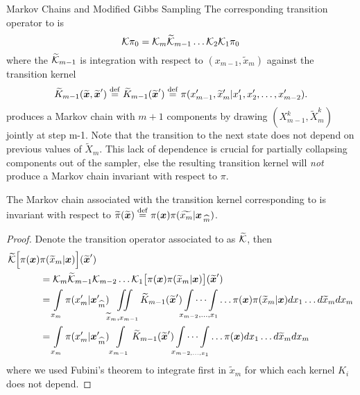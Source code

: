 \begin{chapter}{Markov Chains and Modified Gibbs Sampling}
The corresponding transition operator to  is
\begin{equation}
  \mathcal K\pi_0 = \mathcal K_m \widetilde {\mathcal K}_{m-1}\dots \mathcal K_2 \mathcal K_1 \pi_0
\end{equation}
where the $\widetilde{\mathcal K}_{m-1}$ is integration with respect to $(x_{m-1},\tilde x_m)$ against the transition kernel
\begin{equation}
  \widetilde K_{m-1}(\widetilde{\mbox{\boldmath$x$}},\widetilde{\mbox{\boldmath$x$}}') \stackrel{\rm def}{=} \widetilde K_{m-1}(\widetilde{\mbox{\boldmath$x$}}') \stackrel{\rm def}{=} \pi(x_{m-1}',\widetilde x_m'|x_1',x_2',\dots,x_{m-2}').
\end{equation}
 produces a Markov chain with $m+1$ components by drawing $(X_{m-1}^k,\tilde X_m^k)$ jointly at step m-1. 
Note that the transition to the next state does not depend on previous values of $\tilde X_m$.
This lack of dependence is crucial for partially collapsing components out of the sampler, else the resulting transition kernel will \emph{not} produce a Markov chain invariant with respect to $\pi$.
\begin{prop}\label{thm:conditionedGibbsStationary}
  The Markov chain associated with the transition kernel corresponding to  is invariant with respect to $\widetilde\pi(\widetilde{\mbox{\boldmath$x$}}) \stackrel{\rm def}{=} \pi(\mbox{\boldmath$x$})\pi(\widetilde{x_m}|\mbox{\boldmath$x$}_{\,\widehat{m}})$.
\end{prop}
\begin{proof}
  Denote the transition operator associated to  as $\widetilde {\mathcal K}$, then
  \begin{align}
    \widetilde{\mathcal K}\Big[ \pi(\mbox{\boldmath$x$})&\pi(\widetilde x_m|\mbox{\boldmath$x$})\Big](\widetilde{\mbox{\boldmath$x$}}') \nonumber \\ 
    &= \mathcal K_m \widetilde{\mathcal K}_{m-1} \mathcal K_{m-2}\dots\mathcal K_{1} \big[\pi(\mbox{\boldmath$x$})\pi(\widetilde x_m|\mbox{\boldmath$x$})\big](\widetilde{\mbox{\boldmath$x$}}') \nonumber\\
    &= \int\limits_{x_m} \pi(x_m'|\mbox{\boldmath$x$}_{\,\widehat{m}}')\iint\limits_{\widetilde x_m,x_{m-1}}\widetilde K_{m-1}(\widetilde{\mbox{\boldmath$x$}}')\idotsint\limits_{x_{m-2},\dots,x_1}\dots \pi(\mbox{\boldmath$x$})\pi(\widetilde x_m|\mbox{\boldmath$x$})dx_1\dots d\widetilde x_m dx_m \nonumber\\
    &= \int\limits_{x_m} \pi(x_m'|\mbox{\boldmath$x$}_{\,\widehat{m}}')\int\limits_{x_{m-1}}\widetilde K_{m-1}(\widetilde{\mbox{\boldmath$x$}}')\idotsint\limits_{x_{m-2,\dots,x_1}}\dots \pi(\mbox{\boldmath$x$})dx_1\dots d\widetilde x_m dx_m \label{eq:conditionedGibbsCalc}
  \end{align}
  where we used Fubini's theorem to integrate first in $\tilde x_m$ for which each kernel $K_i$ does not depend. 

\end{proof}
\end{chapter}
